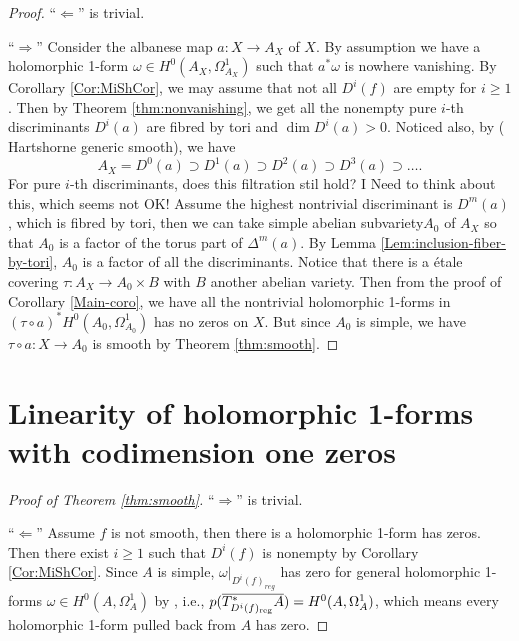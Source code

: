\documentclass[a4paper,12pt,reqno]{amsart}
\theoremstyle{plain}
\theoremstyle{remark}
\begin{document}
\begin{proof}
``$\Leftarrow$'' is trivial.

``$\Rightarrow$'' Consider the albanese map $a: X\to A_X$ of $X$. By assumption we have a holomorphic 1-form $\omega\in H^0(A_X, \Omega_{A_X}^1)$ such that $a^*\omega$ is nowhere vanishing. By Corollary \ref{Cor:MiShCor}, we may assume that not all $D^i(f)$ are empty for $i\geq 1$. %
Then by Theorem \ref{thm:nonvanishing}, we get all the nonempty pure $i$-th discriminants $D^i(a)$ are fibred by tori and $\dim D^i(a)>0$. Noticed also, by ({\color{red} Hartshorne generic smooth}), we have $$A_X=D^0(a)\supset D^1(a)\supset D^2(a)\supset D^3(a)\supset\ldots.$$ {\color{blue} For pure $i$-th discriminants, does this filtration stil hold? I Need to think about this, which seems not OK! } Assume the highest nontrivial discriminant is $D^m(a)$, which is fibred by tori, then we can take simple abelian subvariety$A_0$ of $A_X$ so that $A_0$ is a factor of the torus part of  $\Delta^m(a)$. By Lemma \ref{Lem:inclusion-fiber-by-tori}, $A_0$ is a factor of all the discriminants. Notice that there is a \'etale covering $\tau: A_X\to A_0\times B$ with $B$ another abelian variety. Then from the proof of Corollary \ref{Main-coro}, we have all the nontrivial holomorphic 1-forms in $(\tau\circ a)^*H^0(A_0, \Omega_{A_0}^1)$ has no zeros on $X$. But since $A_0$ is simple, we have $\tau\circ a: X\to A_0$ is smooth by Theorem \ref{thm:smooth}.   
\end{proof}



\section{Linearity of holomorphic 1-forms with codimension one zeros}

\begin{proof}[Proof of Theorem \ref{thm:smooth}]
``$\Rightarrow$'' is trivial.

``$\Leftarrow$'' Assume $f$ is not smooth, then there is a holomorphic 1-form has zeros. Then there exist $i\geq 1$ such that $D^i(f)$ is nonempty by Corollary \ref{Cor:MiShCor}. Since $A$ is simple, $\omega|_{D^i(f)_{reg}}$ has zero for general holomorphic 1-forms $\omega\in H^0(A, \Omega_A^1)$ by \cite[Proposition 3.1]{HK05}, i.e.,  $p(\overline{T^*_{D^i(f)_{\textnormal{reg}}}A})=H^0(A, \Omega_A^1)$, which means every holomorphic 1-form pulled back from $A$ has zero.
\end{proof}
\end{document}
